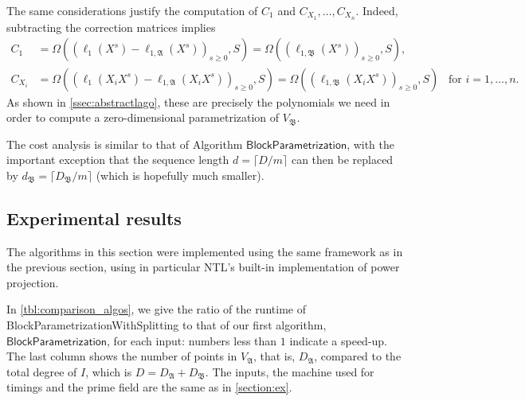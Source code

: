 \documentclass[final,1p,times,authoryear]{elsarticle}
\newcommand{\mainalgoname}{\mathsf{ BlockParametrization}}
\newcommand{\lf}{X}
\begin{document}
The same considerations justify the computation of $C_1$ and
$C_{X_1},\dots,C_{X_n}$. Indeed, subtracting the correction matrices
implies
\begin{align*}
  C_1 &= \Omega( (\ell_1(\lf^s)-\ell_{1,\mathfrak{A}}(\lf^s))_{s \ge 0}, S) =  \Omega( (\ell_{1,\mathfrak{B}}(\lf^s))_{s \ge 0}, S), \\
  C_{X_i} &= \Omega( (\ell_1(X_i \lf^s)-\ell_{1,\mathfrak{A}}(X_i \lf^s))_{s \ge 0}, S) =  \Omega( (\ell_{1,\mathfrak{B}}(X_i\lf^s))_{s \ge 0}, S) \;\;\;\text{for } i=1,\dots,n.
\end{align*}
As shown in \cref{ssec:abstractlago}, these are precisely 
the polynomials we need in order to compute a zero-dimensional parametrization
of $V_\mathfrak{B}$.

The cost analysis is similar to that of Algorithm $\mainalgoname$,
with the important exception that the sequence length $d=\lceil
D/m\rceil$ can then be replaced by $d_\mathfrak{B}=\lceil
D_\mathfrak{B}/m\rceil$  (which is hopefully much smaller).



\subsection{Experimental results}

The algorithms in this section were implemented using the same
framework as in the previous section, using in particular NTL's
built-in implementation of power projection.

In \cref{tbl:comparison_algos}, we give the ratio of the runtime of
{\sf Block\-Parametrization\-WithSplitting} to that of our first
algorithm, $\mainalgoname$, for each input: numbers less than $1$
indicate a speed-up.  The last column shows the number of points in
$V_\mathfrak{A}$, that is, $D_\mathfrak{A}$, compared to the total
degree of $I$, which is $D=D_\mathfrak{A}+D_\mathfrak{B}$. The inputs,
the machine used for timings and the prime field are the same as in
\cref{section:ex}.
\end{document}
